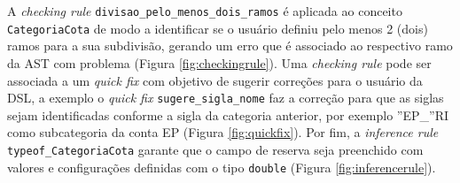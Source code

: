 

\newpage
A \textit{checking rule} \texttt{divisao\_pelo\_menos\_dois\_ramos} é aplicada ao conceito \texttt{CategoriaCota} de modo a identificar se o usuário definiu pelo menos 2 (dois) ramos para a sua subdivisão, gerando um erro que é associado ao respectivo ramo da AST com problema (Figura \ref{fig:checkingrule}). Uma \textit{checking rule} pode ser associada a um \textit{quick fix} com objetivo de sugerir correções para o usuário da \gls{DSL}, a exemplo o \textit{quick fix} \texttt{sugere\_sigla\_nome} faz a correção para que as siglas sejam identificadas conforme a sigla da categoria anterior, por exemplo ''EP\_''RI como subcategoria da conta EP (Figura \ref{fig:quickfix}). Por fim, a \textit{inference rule} \texttt{typeof\_CategoriaCota} garante que o campo de reserva seja preenchido com valores e configurações definidas com o tipo \texttt{double} (Figura \ref{fig:inferencerule}).
